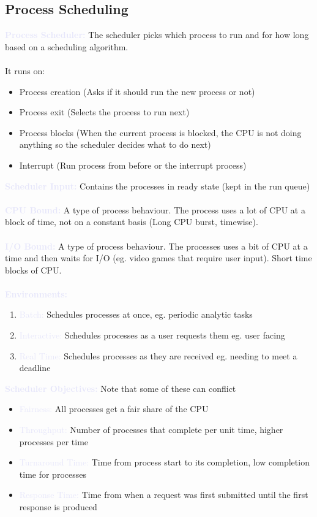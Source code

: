 \documentclass[a4paper,10pt]{article}
\begin{document}
\subsection{Process Scheduling}
\textcolor{Lavender}{\textbf{Process Scheduler:}} The scheduler picks which process to run and for how long based on a scheduling algorithm. \\\\
It runs on: 
\begin{itemize}
\item Process creation (Asks if it should run the new process or not)
\item Process exit (Selects the process to run next)
\item Process blocks (When the current process is blocked, the CPU is not doing anything so the scheduler decides what to do next)
\item Interrupt (Run process from before or the interrupt process)
\end{itemize}
\textcolor{Lavender}{\textbf{Scheduler Input:}} Contains the processes in ready state (kept in the run queue) \\\\
\textcolor{Lavender}{\textbf{CPU Bound:}} A type of process behaviour. The process uses a lot of CPU at a block of time, not on a constant basis (Long CPU burst, timewise). \\\\
\textcolor{Lavender}{\textbf{I/O Bound:}} A type of process behaviour. The processes uses a bit of CPU at a time and then waits for I/O (eg. video games that require user input). Short time blocks of CPU. \\\\
\textcolor{Lavender}{\textbf{Environments:}}
\begin{enumerate}
\item \textcolor{Lavender}{Batch:} Schedules processes at once, eg. periodic analytic tasks
\item \textcolor{Lavender}{Interactive:} Schedules processes as a user requests them eg. user facing 
\item \textcolor{Lavender}{Real Time:} Schedules processes as they are received eg. needing to meet a deadline \\
\end{enumerate}
\textcolor{Lavender}{\textbf{Scheduler Objectives:}} Note that some of these can conflict 
\begin{itemize}
\item \textcolor{Lavender}{Fairness:} All processes get a fair share of the CPU
\item \textcolor{Lavender}{Throughput:} Number of processes that complete per unit time, higher processes per time 
\item \textcolor{Lavender}{Turnaround Time:} Time from process start to its completion, low completion time for processes
\item \textcolor{Lavender}{Response Time:} Time from when a request was first submitted until the first response is produced \\
\end{itemize}
\end{document}
